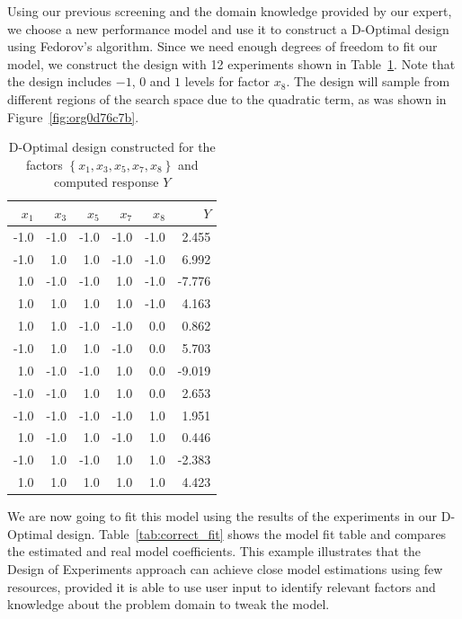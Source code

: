 \documentclass[conference]{IEEEtran}
\begin{document}
Using our previous screening and the domain knowledge provided by our expert, we
choose a new performance model and use it to construct a D-Optimal design using
Fedorov's algorithm. Since we need enough degrees of freedom to fit our model,
we construct the design with 12 experiments shown in Table~\ref{tab:d_optimal}.
Note that the design includes \(-1\), \(0\) and \(1\) levels for factor \(x_8\). The design
will sample from different regions of the search space due to the quadratic term,
as was shown in Figure~\ref{fig:org0d76c7b}.

\begin{table}[t]
\centering
\caption{D-Optimal design constructed for the factors $\left\{x_1,x_3,x_5,x_7,x_8\right\}$ and computed response $Y$}
\label{tab:d_optimal}
\begingroup\footnotesize
\begin{tabular}{rrrrrr}
  \toprule
$x_1$ & $x_3$ & $x_5$ & $x_7$ & $x_8$ & $Y$ \\
  \midrule
-1.0 & -1.0 & -1.0 & -1.0 & -1.0 & 2.455 \\
  -1.0 & 1.0 & 1.0 & -1.0 & -1.0 & 6.992 \\
  1.0 & -1.0 & -1.0 & 1.0 & -1.0 & -7.776 \\
  1.0 & 1.0 & 1.0 & 1.0 & -1.0 & 4.163 \\
  1.0 & 1.0 & -1.0 & -1.0 & 0.0 & 0.862 \\
  -1.0 & 1.0 & 1.0 & -1.0 & 0.0 & 5.703 \\
  1.0 & -1.0 & -1.0 & 1.0 & 0.0 & -9.019 \\
  -1.0 & -1.0 & 1.0 & 1.0 & 0.0 & 2.653 \\
  -1.0 & -1.0 & -1.0 & -1.0 & 1.0 & 1.951 \\
  1.0 & -1.0 & 1.0 & -1.0 & 1.0 & 0.446 \\
  -1.0 & 1.0 & -1.0 & 1.0 & 1.0 & -2.383 \\
  1.0 & 1.0 & 1.0 & 1.0 & 1.0 & 4.423 \\
   \bottomrule
\end{tabular}
\endgroup
\end{table}

We are now going to fit this model using the results of the experiments in our
D-Optimal design. Table~\ref{tab:correct_fit} shows the model fit table
and compares the estimated and real model coefficients. This example illustrates
that the Design of Experiments approach can achieve close model estimations
using few resources, provided it is able to use user input to identify relevant
factors and knowledge about the problem domain to tweak the model.
\end{document}
